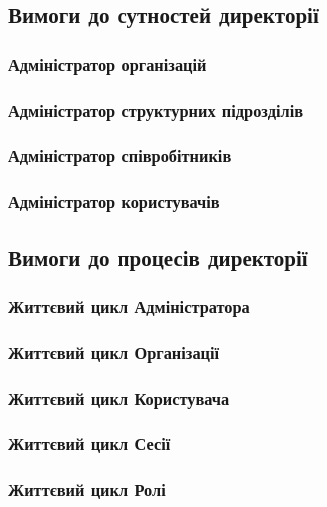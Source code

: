 \subsection{Вимоги до сутностей директорії}

\subsubsection{Адміністратор організацій}

\subsubsection{Адміністратор структурних підрозділів}

\subsubsection{Адміністратор співробітників}

\subsubsection{Адміністратор користувачів}

\subsection{Вимоги до процесів директорії}

\subsubsection{Життєвий цикл Адміністратора}

\subsubsection{Життєвий цикл Організації}

\subsubsection{Життєвий цикл Користувача}

\subsubsection{Життєвий цикл Сесії}

\subsubsection{Життєвий цикл Ролі}

